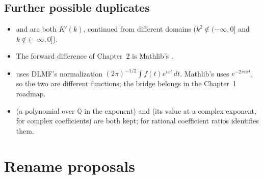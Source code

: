 \documentclass[11pt,a4paper]{article}
\begin{document}
\subsection{Further possible duplicates}

\begin{itemize}
  \item {} and  are
    both $K'(k)$, continued from different domains ($k^2\notin(-\infty,0]$ and
    $k\notin(-\infty,0]$).
  \item The forward difference of Chapter~2 is Mathlib's .
  \item {} uses DLMF's normalization
    $(2\pi)^{-1/2}\int f(t)e^{ixt}\,dt$. Mathlib's  uses
    $e^{-2\pi i xt}$, so the two are different functions; the bridge belongs in the
    Chapter~1 roadmap.
  \item {} (a polynomial over $\mathbb Q$ in the
    exponent) and  (its value at a complex
    exponent, for complex coefficients) are both kept; for rational coefficient ratios
     identifies
    them.
\end{itemize}

\section{Rename proposals}
\end{document}
